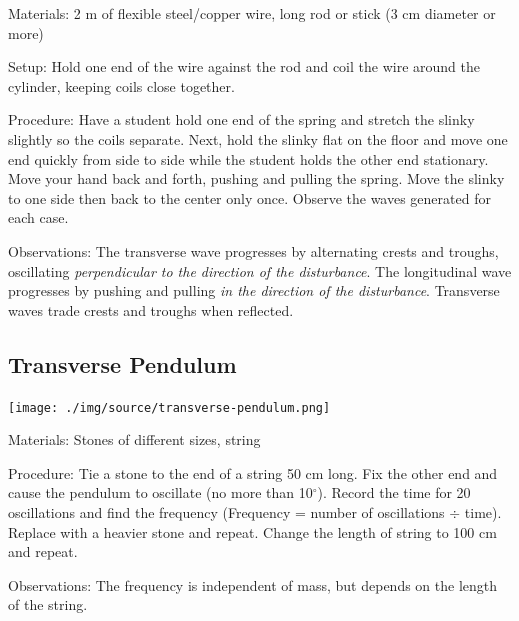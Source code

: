 \begin{multicols}{2}
\begin{description*}
\item[Materials:]{2 m of flexible steel/copper wire, long rod or stick (3 cm diameter or more)}
\item[Setup:]{Hold one end of the wire against the rod and coil the wire around the cylinder, keeping coils close together.}
\item[Procedure:]{Have a student hold one end of the spring and stretch the slinky slightly so the coils separate. Next, hold the slinky flat on the floor and move one end quickly from side to side while the student holds the other end stationary. Move your hand back and forth, pushing and pulling the spring. Move the slinky to one side then back to the center only once. Observe the waves generated for each case.}
\item[Observations:]{The transverse wave progresses by alternating crests and troughs, oscillating \emph{perpendicular to the direction of the disturbance}. The longitudinal wave progresses by pushing and pulling \emph{in the direction of the disturbance}. Transverse waves trade crests and troughs when reflected.}
\end{description*}

\subsection{Transverse Pendulum}

\begin{center}
\texttt{[image: ./img/source/transverse-pendulum.png]}
\end{center}

\begin{description*}
\item[Materials:]{Stones of different sizes, string}
\item[Procedure:]{Tie a stone to the end of a string 50 cm long. Fix the other end and cause the pendulum to oscillate (no more than 10$^\circ$). Record the time for 20 oscillations and find the frequency (Frequency = number of oscillations $\div$ time). Replace with a heavier stone and repeat. Change the length of string to 100 cm and repeat.}
\item[Observations:]{The frequency is independent of mass, but depends on the length of the string.}
\end{description*}


\end{multicols}

